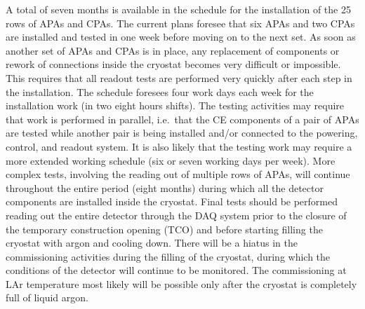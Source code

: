 A total of seven months is available in the schedule for the installation
of the 25 rows of APAs and CPAs. The current plans foresee that six APAs
and two CPAs are installed and
tested in one week before moving on to the next set. As soon as another
set of APAs and CPAs is in place, any replacement of components or rework
of connections inside the cryostat becomes very difficult or impossible.
This requires that all readout tests are performed very quickly after
each step in the installation. The schedule foresees four work days each
week for the installation work (in two eight hours shifts). The testing
activities may require that work is performed in parallel, i.e.~that
the CE components of a pair of APAs are tested while another pair is
being installed and/or connected to the powering, control, and readout
system. It is also likely that the testing work may require a more
extended working schedule (six or seven working days per week). More
complex tests, involving the reading out of multiple rows of APAs, will continue
throughout the entire period (eight months) during which all the detector
components are installed inside the cryostat. Final tests should be
performed reading out the entire detector through the DAQ system
prior to the closure of the temporary construction opening (TCO) and before
starting filling the cryostat with argon and cooling down. There will be a hiatus
in the commissioning activities during the filling of the cryostat, during
which the conditions of the detector will continue to be monitored. The
commissioning at LAr temperature most likely will be possible only
after the cryostat is completely full of liquid argon.
